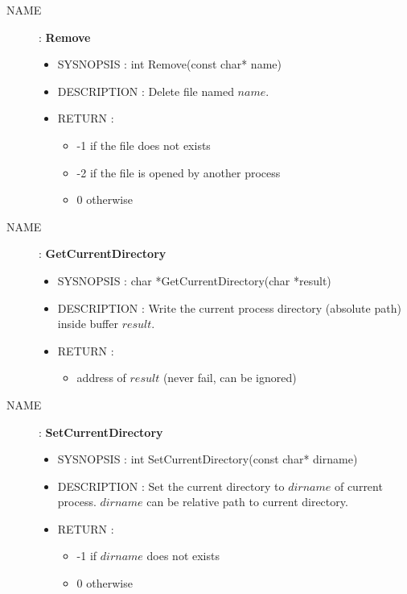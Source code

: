 \begin{description}
            \item [NAME] : \textbf{Remove}
                \begin{itemize}
                    \item SYSNOPSIS : int Remove(const char* name)
                    \item DESCRIPTION :
                        Delete file named $name$.
                    \item RETURN :
                        \begin{itemize}
                            \item -1 if the file does not exists
                            \item -2 if the file is opened by another process
                            \item 0 otherwise
                        \end{itemize}
                \end{itemize}

            \item [NAME] : \textbf{GetCurrentDirectory}
                \begin{itemize}
                    \item SYSNOPSIS : char *GetCurrentDirectory(char *result)
                    \item DESCRIPTION :
                        Write the current process directory (absolute path) inside buffer $result$.
                    \item RETURN :
                        \begin{itemize}
                            \item address of $result$ (never fail, can be ignored)
                        \end{itemize}
                \end{itemize}

            \item [NAME] : \textbf{SetCurrentDirectory}
                \begin{itemize}
                    \item SYSNOPSIS : int SetCurrentDirectory(const char* dirname)
                    \item DESCRIPTION :
                        Set the current directory to $dirname$ of current process.
                        $dirname$ can be relative path to current directory.
                    \item RETURN :
                        \begin{itemize}
                            \item -1 if $dirname$ does not exists
                            \item 0 otherwise
                        \end{itemize}
                \end{itemize}
        \end{description}


